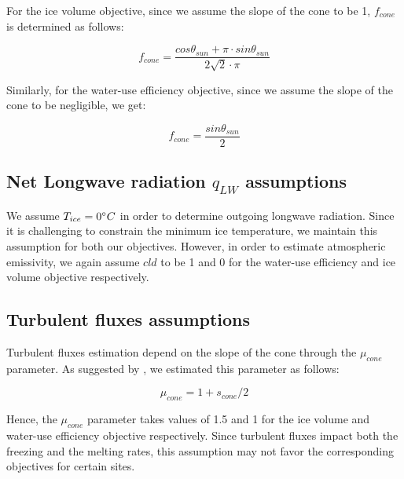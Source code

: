 \documentclass[tc, manuscript]{copernicus}
\begin{document}
For the ice volume objective, since we assume the slope of the cone to be 1, $f_{cone}$ is determined as follows:

\begin{equation}
		f_{cone} =\frac{ cos \theta_{sun} + \pi \cdot sin \theta_{sun} }{2\sqrt{2} \cdot \pi }
\end{equation}

Similarly, for the water-use efficiency objective, since we assume the slope of the cone to be negligible, we get:

\begin{equation}
		f_{cone} =\frac{ sin \theta_{sun} }{2 }
\end{equation}

\subsection{Net Longwave radiation \texorpdfstring{$q_{LW}$}{Lg} assumptions} 

We assume $T_{ice} = 0 ^{\circ} C$ in order to determine outgoing longwave radiation. Since it is challenging to
constrain the minimum ice temperature, we maintain this assumption for both our objectives. However, in order to
estimate atmospheric emissivity, we again assume $cld$ to be 1 and 0 for the water-use efficiency and ice volume
objective respectively.

\subsection{Turbulent fluxes assumptions} \label{sec:Qs}

Turbulent fluxes estimation depend on the slope of the cone through the $\mu_{cone}$ parameter. As suggested 
by \citet{oerlemansBriefCommunicationGrowth2021}, we estimated this parameter as follows:

\begin{equation}
  \mu_{cone} =1 + s_{cone}/2
\end{equation}

Hence, the $\mu_{cone}$ parameter takes values of 1.5 and 1 for the ice volume and water-use efficiency
objective respectively.  Since turbulent fluxes impact both the freezing and the melting rates, this assumption
may not favor the corresponding objectives for certain sites.

\appendixtables   %
\end{document}

